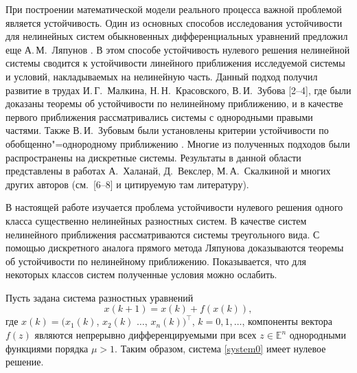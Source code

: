 

\date{14/IX/2011}


\maketitle


 При построении математической модели
реального процесса важной проблемой является устойчивость.
Один из основных способов исследования устойчивости
для нелинейных систем  обыкновенных дифференциальных уравнений предложил
еще А.\,М.~Ляпунов \cite{sultan:bib1}. В этом способе устойчивость нулевого решения
нелинейной системы сводится к устойчивости линейного приближения
исследуемой системы и условий, накладываемых на нелинейную часть.
Данный подход получил развитие в трудах И.\,Г.~Малкина, Н.\,Н.~Красовского, В.\,И.~Зубова [2--4], где были доказаны теоремы об
устойчивости по нелинейному приближению, и в качестве первого
приближения рассматривались системы с однородными правыми частями.
Также В.\,И.~Зубовым были установлены критерии устойчивости по
обобщенно"=однородному приближению \cite{sultan:bib5}.  Многие из полученных подходов были распространены
на дискретные системы. Результаты в данной области
представлены в работах А.~Халанай, Д.~Векслер, М.\,А.~Скалкиной и
многих других авторов (см.~[6--8] и цитируемую там литературу).

В настоящей работе изучается проблема устойчивости нулевого решения одного класса
существенно нелинейных разностных систем. В качестве систем нелинейного приближения рассматриваются системы треугольного вида.
С помощью дискретного аналога прямого метода Ляпунова доказываются теоремы об
устойчивости по нелинейному приближению. Показывается, что для некоторых
классов систем полученные условия можно ослабить.


\smallskip
{} Пусть задана система разностных
уравнений
\begin{equation}
x(k+1)=x(k)+f(x(k)),\label{system0}
\end{equation}
где $x(k)=(x_1(k)$,  $x_2(k)$ $\ldots$, $x_n(k))^\top$, $k=0, 1, \ldots$, компоненты вектора $ f(z)$
являются непрерывно дифференцируемыми при всех $ z\in \mathbb E^n$
однородными функциями порядка  $\mu>1$. Таким образом, система
\eqref{system0} имеет нулевое решение.

